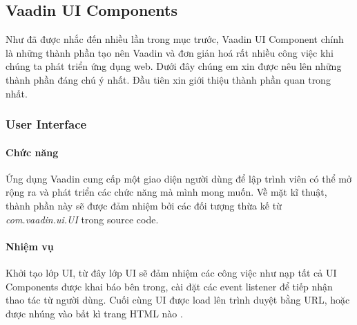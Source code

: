 
\subsection{Vaadin UI Components}
Như đã được nhắc đến nhiều lần trong mục trước, Vaadin UI Component chính là những thành phần tạo nên Vaadin và đơn giản hoá rất nhiều công việc khi chúng ta phát triển ứng dụng web. Dưới đây chúng em xin được nêu lên những thành phần đáng chú ý nhất. Đầu tiên xin giới thiệu thành phần quan trong nhất.

\subsubsection{User Interface} 
\paragraph{Chức năng} Ứng dụng Vaadin cung cấp một giao diện người dùng để lập trình viên có thể mở rộng ra và phát triển các chức năng mà mình mong muốn. Về mặt kĩ thuật, thành phần này sẽ được đảm nhiệm bởi các đối tượng thừa kế từ \textit{com.vaadin.ui.UI} trong source code.
\paragraph{Nhiệm vụ} Khởi tạo lớp UI, từ đây lớp UI sẽ đảm nhiệm các công việc như nạp tất cả UI Components được khai báo bên trong, cài đặt các event listener để tiếp nhận thao tác từ người dùng. Cuối cùng UI được load lên trình duyệt bằng URL, hoặc được nhúng 
vào bất kì trang HTML nào \cite{vaadinarchitecture}.


